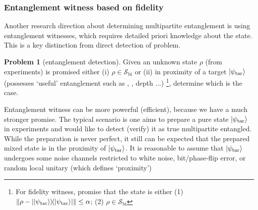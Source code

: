 \documentclass[
reprint,
aps,
pra,
floatfix,
]{revtex4-2}
\theoremstyle{plain}
\theoremstyle{definition}
\newtheorem{problem}{Problem}
\newcommand{\dm}{\rho}
\newcommand{\bi}{\text{bi}}
\newcommand{\target}{\textup{tar}}
\newcommand{\separable}{\mathcal{S}}
\newcommand{\ppartition}{\mathcal{P}}
\begin{document}
\subsubsection{Entanglement witness based on fidelity}\label{sec:entanglement_witness}
Another research direction about determining multipartite entanglement is using entanglement witnesses,
which requires detailed priori knowledge about the state.
This is a key distinction from direct detection of  problem. 
\begin{problem}[entanglement detection]\label{prm:entanglement_detection}
	Given an unknown state $\dm$ (from experiments) is promised either (i) $\dm\in\separable_{\bi}$
	or (ii) in proximity of a target $\ket{\psi_{\target}}$ (possesses `useful' entanglement such as , , depth ...) 
	\footnote{
		For fidelity witness, promise that the state is either (1) $\norm{\dm-\op{\ket{\psi_\target}}}\le \alpha$; 
		(2) $\dm\in\separable_{\bi}$
	},
	determine which is the case.
\end{problem}
Entanglement witness can be more powerful (efficient), because we have a much stronger promise.
The typical scenario is one aims to prepare a pure state $\ket{\psi_\target}$ in experiments and would like to detect (verify) it as true multipartite entangled. 
While the preparation is never perfect, it still can be expected that the prepared mixed state is in the proximity of $\ket{\psi_\target}$. 
It is reasonable to assume that $\ket{\psi_{\target}}$ undergoes some noise channels restricted to white noise, bit/phase-flip error, or random local unitary 
(which defines `proximity')
	
\end{document}
